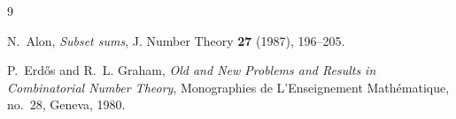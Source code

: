 \documentclass[11pt,reqno]{amsart}
\begin{document}
\begin{thebibliography}{9}

N.~Alon,
\emph{Subset sums},
J. Number Theory \textbf{27} (1987), 196--205.

P.~Erd\H{o}s and R.~L. Graham,
\emph{Old and New Problems and Results in Combinatorial Number Theory},
Monographies de L'Enseignement Math\'ematique, no.~28, Geneva, 1980.

\end{thebibliography}
\end{document}

